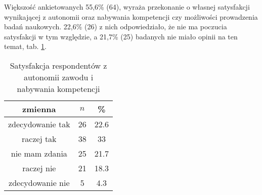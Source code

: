 

Większość ankietowanych 55,6\% (64), wyraża przekonanie o własnej satysfakcji wynikającej z autonomii oraz nabywania kompetencji czy możliwości prowadzenia badań naukowych. 22,6\% (26) z nich odpowiedziało, że nie ma poczucia satysfakcji w tym względzie, a 21,7\% (25) badanych nie miało opinii na ten temat, tab. \ref{tab:Q20}.



\begin{table}[H]
\caption{Satysfakcja respondentów z autonomii zawodu i nabywania kompetencji}
\centering
\begin{tabular}{ | c | c | c |}
\hline
zmienna & $n$ & \% \\
\hline
zdecydowanie tak  &  26  & 22.6 \\
\hline
raczej tak  &  38  & 33\\
\hline
nie mam zdania  &  25  & 21.7\\
\hline
raczej nie  &  21  & 18.3 \\
\hline
zdecydowanie nie  &  5  & 4.3\\
\hline
\end{tabular}
\label{tab:Q20}
\end{table}

